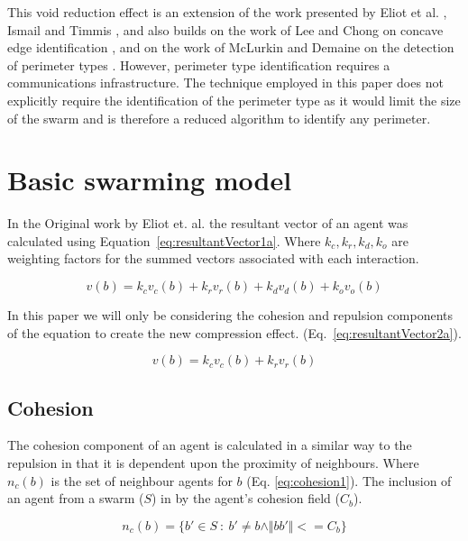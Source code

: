 \documentclass[12pt,a4paper]{IEEEtran}
\newcommand{\magn}[1]{\Vert{#1}\Vert}
\begin{document}
This void reduction effect is an extension of the work presented by Eliot et al. \cite{eliot2019void}, Ismail and Timmis \cite{IT:10,TIBW:16}, and also builds on the work of Lee and Chong on concave edge identification \cite{GN:08}, and on the work of McLurkin and Demaine on the detection of perimeter types \cite{mclurkin2009}. However, perimeter type identification requires a communications infrastructure. The technique employed in this paper does not explicitly require the identification of the perimeter type as it would limit the size of the swarm\cite{eliot2019void,GN:08} and is therefore a reduced algorithm to identify any perimeter.

\section{Basic swarming model}\label{basicModel}
In the Original work by Eliot et. al. the resultant vector of an agent was calculated using Equation~\ref{eq:resultantVector1a}. Where $k_c,k_r,k_d,k_o$ are weighting factors for the summed vectors associated with each interaction. 

\begin{equation}\label{eq:resultantVector1a}
	v(b) = k_cv_c(b) + k_rv_r(b) + k_dv_d(b) + k_ov_o(b)
\end{equation}

In this paper we will only be considering the cohesion and repulsion components of the equation to create the new compression effect. (Eq.~\ref{eq:resultantVector2a}).

\begin{equation}\label{eq:resultantVector2a}
v(b) = k_cv_c(b) + k_rv_r(b)
\end{equation}

\subsection{Cohesion}\label{cohesion}
The cohesion component of an agent is calculated in a similar way to the repulsion in that it is dependent upon the proximity of neighbours. Where $n_c(b)$ is the set of neighbour agents for $b$ (Eq. \ref{eq:cohesion1}). The inclusion of an agent from a swarm ($S$) in by the agent's cohesion field ($C_b$).

\begin{equation}\label{eq:cohesion1}
n_c(b) = \{b' \in S~:~b' \neq b \land\magn{bb'} <= C_b\}
\end{equation}
\end{document}
